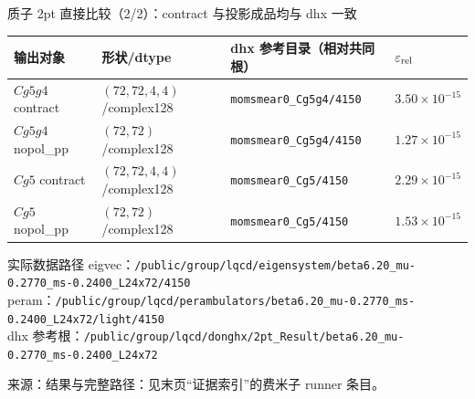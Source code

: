 \documentclass[UTF8,aspectratio=169,11pt]{ctexbeamer}
\newcommand{\source}[1]{\vspace{0.05em}\par{\raggedright\scriptsize\color{muted}来源：#1\par}}
\newcommand{\codepath}[1]{\nolinkurl{#1}}
\begin{document}
\begin{frame}[t]{质子 2pt 直接比较（2/2）：contract 与投影成品均与 dhx 一致}
  \small
  \begin{tabularx}{0.96\textwidth}{@{}P{0.25\textwidth} P{0.26\textwidth} Y P{0.17\textwidth}@{}}
    \toprule
    输出对象 & 形状/dtype & dhx 参考目录（相对共同根） & $\varepsilon_{\rm rel}$ \\
    \midrule
    $Cg5g4$ contract & $(72,72,4,4)$/complex128 & \codepath{momsmear0_Cg5g4/4150} & $3.50\times10^{-15}$ \\
    $Cg5g4$ nopol\_pp & $(72,72)$/complex128 & \codepath{momsmear0_Cg5g4/4150} & $1.27\times10^{-15}$ \\
    $Cg5$ contract & $(72,72,4,4)$/complex128 & \codepath{momsmear0_Cg5/4150} & $2.29\times10^{-15}$ \\
    $Cg5$ nopol\_pp & $(72,72)$/complex128 & \codepath{momsmear0_Cg5/4150} & $1.53\times10^{-15}$ \\
    \bottomrule
  \end{tabularx}
  \vspace{0.10em}
  \begin{block}{实际数据路径}
    \scriptsize
    eigvec：\codepath{/public/group/lqcd/eigensystem/beta6.20_mu-0.2770_ms-0.2400_L24x72/4150}\\
    peram：\codepath{/public/group/lqcd/perambulators/beta6.20_mu-0.2770_ms-0.2400_L24x72/light/4150}\\
    dhx 参考根：\codepath{/public/group/lqcd/donghx/2pt_Result/beta6.20_mu-0.2770_ms-0.2400_L24x72}
  \end{block}
  \source{结果与完整路径：见末页“证据索引”的费米子 runner 条目。}
\end{frame}
\end{document}

